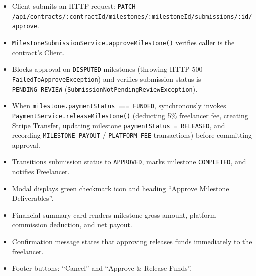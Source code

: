 \begin{itemize}[leftmargin=1.6em,topsep=3pt,itemsep=2pt,parsep=0pt,label=$\bullet$]
      \item Client submits an HTTP request: \texttt{PATCH /\allowbreak{}api/\allowbreak{}contracts/\allowbreak{}:\allowbreak{}contractId/\allowbreak{}milestones/\allowbreak{}:\allowbreak{}milestoneId/\allowbreak{}submissions/\allowbreak{}:\allowbreak{}id/\allowbreak{}approve}.
      \item \texttt{Milestone\allowbreak{}Submission\allowbreak{}Service.\allowbreak{}approve\allowbreak{}Milestone()} verifies caller is the contract's Client.
      \item {\sloppy Blocks approval on \texttt{DISPUTED} milestones (throwing HTTP 500 \texttt{Failed\allowbreak{}To\allowbreak{}Approve\allowbreak{}Exception}) and verifies submission status is \texttt{PENDING\_REVIEW} (\texttt{Submission\allowbreak{}Not\allowbreak{}Pending\allowbreak{}Review\allowbreak{}Exception}).\par}
      \item When \texttt{milestone.paymentStatus === FUNDED}, synchronously invokes \texttt{PaymentService.releaseMilestone()} (deducting 5\% freelancer fee, creating Stripe Transfer, updating milestone \texttt{paymentStatus = RELEASED}, and recording \texttt{MILESTONE\_PAYOUT} / \texttt{PLATFORM\_FEE} transactions) before committing approval.
      \item Transitions submission status to \texttt{APPROVED}, marks milestone \texttt{COMPLETED}, and notifies Freelancer.
\end{itemize}

\begin{itemize}[leftmargin=1.6em,topsep=3pt,itemsep=2pt,parsep=0pt,label=$\bullet$]
      \item Modal displays green checkmark icon and heading ``Approve Milestone Deliverables''.
      \item Financial summary card renders milestone gross amount, platform commission deduction, and net payout.
      \item Confirmation message states that approving releases funds immediately to the freelancer.
      \item Footer buttons: ``Cancel'' and ``Approve \& Release Funds''.
\end{itemize}

